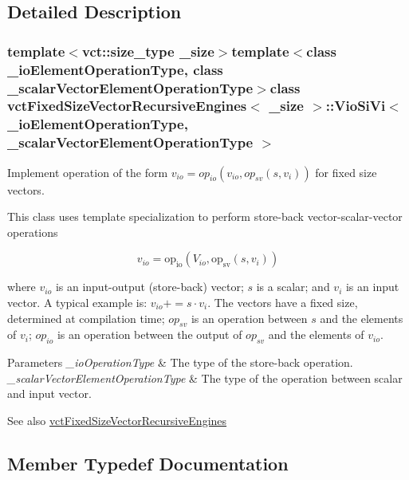 \subsection{Detailed Description}
\subsubsection*{template$<$vct\+::size\+\_\+type \+\_\+size$>$template$<$class \+\_\+io\+Element\+Operation\+Type, class \+\_\+scalar\+Vector\+Element\+Operation\+Type$>$class vct\+Fixed\+Size\+Vector\+Recursive\+Engines$<$ \+\_\+size $>$\+::\+Vio\+Si\+Vi$<$ \+\_\+io\+Element\+Operation\+Type, \+\_\+scalar\+Vector\+Element\+Operation\+Type $>$}

Implement operation of the form $v_{io} = op_{io}(v_{io}, op_{sv}(s, v_i))$ for fixed size vectors. 

This class uses template specialization to perform store-\/back vector-\/scalar-\/vector operations

\[ v_{io} = \mathrm{op_{io}}(V_{io}, \mathrm{op_{sv}}(s, v_i)) \]

where $v_{io}$ is an input-\/output (store-\/back) vector; $s$ is a scalar; and $v_i$ is an input vector. A typical example is\+: $v_{io} += s \cdot v_i$. The vectors have a fixed size, determined at compilation time; $op_{sv}$ is an operation between $s$ and the elements of $v_i$; $op_{io}$ is an operation between the output of $op_{sv}$ and the elements of $v_{io}$.


\begin{DoxyParams}{Parameters}
{\em \+\_\+io\+Operation\+Type} & The type of the store-\/back operation.\\
\hline
{\em \+\_\+scalar\+Vector\+Element\+Operation\+Type} & The type of the operation between scalar and input vector.\\
\hline
\end{DoxyParams}
\begin{DoxySeeAlso}{See also}
\hyperlink{classvct_fixed_size_vector_recursive_engines}{vct\+Fixed\+Size\+Vector\+Recursive\+Engines} 
\end{DoxySeeAlso}


\subsection{Member Typedef Documentation}
\hypertarget{classvct_fixed_size_vector_recursive_engines_1_1_vio_si_vi_adb732c70954b6a4f3ddd7b55b273dcc3}{}
